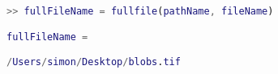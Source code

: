 \begin{lstlisting}[language=matlab]
>> fullFileName = fullfile(pathName, fileName)

fullFileName =

/Users/simon/Desktop/blobs.tif

\end{lstlisting}